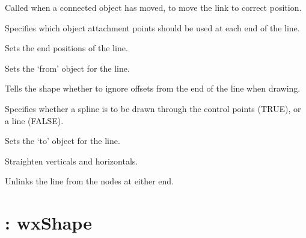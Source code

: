 
Called when a connected object has moved, to move the link to
correct position.



Specifies which object attachment points should be used at each end of the line.



Sets the end positions of the line.



Sets the `from' object for the line.



Tells the shape whether to ignore offsets from the end of the line when drawing.



Specifies whether a spline is to be drawn through the control points (TRUE), or a line (FALSE).



Sets the `to' object for the line.



Straighten verticals and horizontals.



Unlinks the line from the nodes at either end.


\section{: wxShape}\label{wxpolygonshape}

